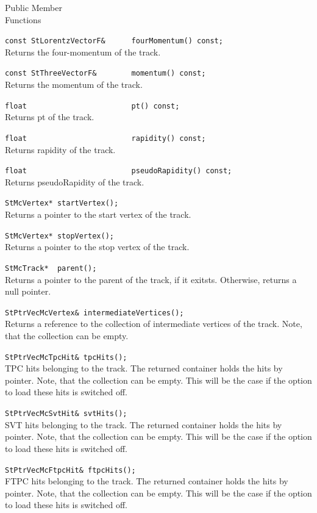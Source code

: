 \begin{Entry}
\item[Public Member\\ Functions]

    \verb+const StLorentzVectorF&      fourMomentum() const;+\\
    Returns the four-momentum of the track.

    \verb+const StThreeVectorF&        momentum() const;+\\
    Returns the momentum of the track.

    \verb+float                        pt() const;+\\
    Returns pt of the track.

    \verb+float                        rapidity() const;+\\
    Returns rapidity of the track.

    \verb+float                        pseudoRapidity() const;+\\
    Returns pseudoRapidity of the track.

    \verb+StMcVertex* startVertex();+\\
    Returns a pointer to the start vertex of the track.

    \verb+StMcVertex* stopVertex();+\\
    Returns a pointer to the stop vertex of the track.

    \verb+StMcTrack*  parent();+\\
    Returns a pointer to the parent of the track, if it exitsts.  Otherwise, returns a
    null pointer.

    \verb+StPtrVecMcVertex& intermediateVertices();+\\
    Returns a reference to the collection of intermediate vertices of the track.
    Note, that the collection can be empty.

    \verb+StPtrVecMcTpcHit& tpcHits();+\\
    TPC hits belonging to the track.
    The returned container holds the
    hits by pointer. Note, that the collection can be empty.
    This will be the case if the option to load these hits is switched off.

    \verb+StPtrVecMcSvtHit& svtHits();+\\
    SVT hits belonging to the track.
    The returned container holds the
    hits by pointer. Note, that the collection can be empty.
    This will be the case if the option to load these hits is switched off.

    \verb+StPtrVecMcFtpcHit& ftpcHits();+\\
    FTPC hits belonging to the track.
    The returned container holds the
    hits by pointer. Note, that the collection can be empty.
    This will be the case if the option to load these hits is switched off.


\end{Entry}
